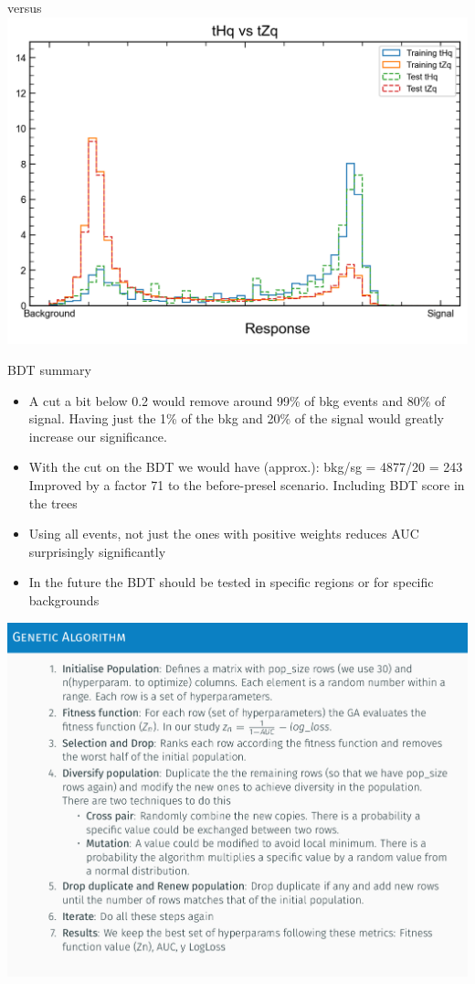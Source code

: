 \begin{frame}{\tHq versus \tZq}
  \includegraphics[width=\textwidth]{tHqvstZq.png}
\end{frame}

\begin{frame}{BDT summary}
    \begin{itemize}
        \item {\large A cut a bit below 0.2 would remove around 99\% of bkg
            events and 80\% of signal. Having just the 1\% of the bkg
            and 20\% of the signal would greatly increase our
            significance.}
        \vspace{0.2cm}
        \item {\large With the cut on the BDT we would have (approx.): bkg/sg = 4877/20 = 243
              Improved by a factor 71 to the before-presel scenario. Including BDT score in the trees}
        \vspace{0.2cm}
        \item {\large Using all events, not just the ones with positive weights reduces AUC surprisingly significantly}
        \vspace{0.2cm}
        \item {\large In the future the BDT should be tested in specific regions or for specific backgrounds}
    \end{itemize}
\end{frame}

\begin{frame}{}
  \centering \includegraphics[width=\textwidth]{geneticAlg}
\end{frame}
